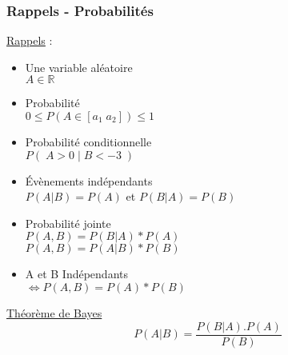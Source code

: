 \begin{frame}
  \frametitle{Rappels - Probabilités}
  \begin{minipage}[c]{0.60\linewidth}
    \underline{Rappels} :
    \begin{itemize}
    \item Une variable aléatoire \\ $A\in\mathbb{R}$
    \item Probabilité \\ $0 \leq P(A\in[a_1\;a_2]) \leq 1$
    \item Probabilité conditionnelle \\ $P(\;A>0\;|\;B<-3\;)$
    \item Évènements indépendants \\ $P(A|B)=P(A)$ et $P(B|A)=P(B)$
    \item Probabilité jointe \\ $P(A,B)=P(B|A)*P(A)$ \\ $P(A,B)=P(A|B)*P(B)$
    \item A et B Indépendants \\ $\iff P(A,B) = P(A)*P(B)$ 
    \end{itemize}
  \end{minipage}\hfill
  \begin{minipage}[c]{0.39\linewidth}
    \begin{center}
      \underline{Théorème de Bayes}
      \[
      \boxed{P(A|B)=\frac{P(B|A).P(A)}{P(B)}}
      \]
    \end{center}
  \end{minipage}\hfill
\end{frame}
